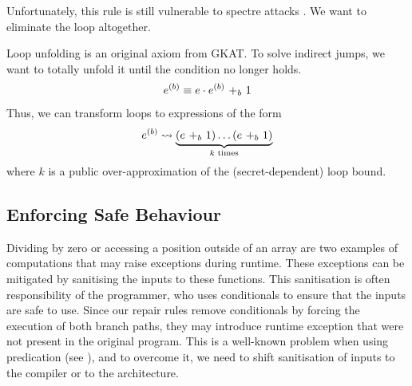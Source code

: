 Unfortunately, this rule is still vulnerable to spectre attacks . We want to eliminate the loop altogether.
\begin{definition}
Loop unfolding is an original axiom from GKAT. To solve indirect jumps, we want to totally unfold it until the condition no longer holds.
\begin{align*}
\iterate{b}{e} \equiv \branch{b}{e\cdot\iterate{b}{e}}{1} 
\end{align*}
Thus, we can transform loops to expressions of the form
\begin{align*}
\iterate{b}{e} \leadsto \underbrace{\left(\branch{b}{e}{1}\right)\ldots\left(\branch{b}{e}{1}\right)}_\text{$k$ times}
\end{align*}
where $k$ is a public over-approximation of the (secret-dependent) loop bound.
\end{definition}

\subsection{Enforcing Safe Behaviour}
Dividing by zero or accessing a position outside of an array are two examples of computations that may raise exceptions during runtime. These exceptions can be mitigated by sanitising the inputs to these functions. This sanitisation is often responsibility of the programmer, who uses conditionals to ensure that the inputs are safe to use. Since our repair rules remove conditionals by forcing the execution of both branch paths, they may introduce runtime exception that were not present in the original program. This is a well-known problem when using predication (see \cite{Rane}), and to overcome it, we need to shift sanitisation of inputs to the compiler or to the architecture. 

